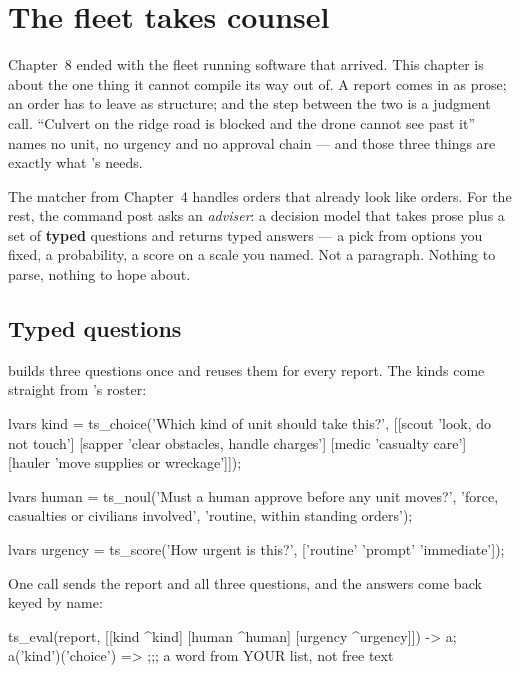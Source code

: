 \chapter{The fleet takes counsel}

Chapter~8 ended with the fleet running software that arrived. This chapter
is about the one thing it cannot compile its way out of. A report comes in
as prose; an order has to leave as structure; and the step between the two
is a judgment call. ``Culvert on the ridge road is blocked and the drone
cannot see past it'' names no unit, no urgency and no approval chain --- and
those three things are exactly what 's 
needs.

The matcher from Chapter~4 handles orders that already look like orders.
For the rest, the command post asks an \emph{adviser}: a decision model that
takes prose plus a set of \textbf{typed} questions and returns typed
answers --- a pick from options you fixed, a probability, a score on a scale
you named. Not a paragraph. Nothing to parse, nothing to hope about.

\section{Typed questions}

 builds three questions once and reuses them for every
report. The kinds come straight from 's roster:

\begin{pop}
lvars kind = ts_choice('Which kind of unit should take this?',
                       [[scout  'look, do not touch']
                        [sapper 'clear obstacles, handle charges']
                        [medic  'casualty care']
                        [hauler 'move supplies or wreckage']]);

lvars human = ts_noul('Must a human approve before any unit moves?',
                      'force, casualties or civilians involved',
                      'routine, within standing orders');

lvars urgency = ts_score('How urgent is this?',
                         ['routine' 'prompt' 'immediate']);
\end{pop}

\noindent One call sends the report and all three questions, and the
answers come back keyed by name:

\begin{pop}
ts_eval(report, [[kind ^kind] [human ^human] [urgency ^urgency]]) -> a;
a('kind')('choice') =>          ;;; a word from YOUR list, not free text
\end{pop}

